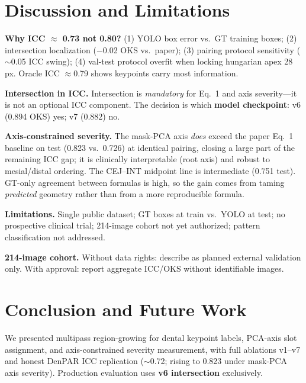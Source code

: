 \documentclass[conference]{IEEEtran}
\begin{document}
\section{Discussion and Limitations}
\label{sec:discussion}

\textbf{Why ICC $\approx$ 0.73 not 0.80?} (1) YOLO box error vs.\ GT training boxes; (2) intersection localization ($-$0.02 OKS vs.\ paper); (3) pairing protocol sensitivity ($\sim$0.05 ICC swing); (4) val-test protocol overfit when locking hungarian apex 28\,px. Oracle ICC $\approx$0.79 shows keypoints carry most information.

\textbf{Intersection in ICC.} Intersection is \emph{mandatory} for Eq.~1 and axis severity---it is not an optional ICC component. The decision is which \textbf{model checkpoint}: v6 (0.894 OKS) yes; v7 (0.882) no.

\textbf{Axis-constrained severity.} The mask-PCA axis \emph{does} exceed the paper Eq.~1 baseline on test (0.823 vs.\ 0.726) at identical pairing, closing a large part of the remaining ICC gap; it is clinically interpretable (root axis) and robust to mesial/distal ordering. The CEJ--INT midpoint line is intermediate (0.751 test). GT-only agreement between formulas is high, so the gain comes from taming \emph{predicted} geometry rather than from a more reproducible formula.

\textbf{Limitations.} Single public dataset; GT boxes at train vs.\ YOLO at test; no prospective clinical trial; 214-image cohort not yet authorized; pattern classification not addressed.

\textbf{214-image cohort.} Without data rights: describe as planned external validation only. With approval: report aggregate ICC/OKS without identifiable images.

\section{Conclusion and Future Work}
\label{sec:conclusion}

We presented multipass region-growing for dental keypoint labels, PCA-axis slot assignment, and axis-constrained severity measurement, with full ablations v1--v7 and honest DenPAR ICC replication ($\sim$0.72; rising to 0.823 under mask-PCA axis severity). Production evaluation uses \textbf{v6 intersection} exclusively.
\end{document}
